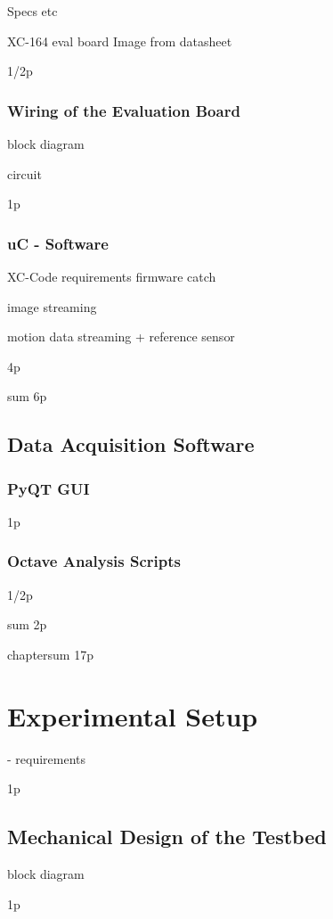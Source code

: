 \documentclass[12pt,a4paper]{article}
\begin{document}
Specs etc

XC-164 eval board 
  Image from datasheet

1/2p

\subsubsection{Wiring of the Evaluation Board}

  block diagram

  circuit

1p

\subsubsection{uC - Software}

  XC-Code
    requirements
    firmware catch

    image streaming

    motion data streaming
      + reference sensor

4p

sum 6p


\subsection{Data Acquisition Software}

\subsubsection{PyQT GUI}
1p

\subsubsection{Octave Analysis Scripts}
1/2p


sum 2p

chaptersum 17p

\section{Experimental Setup}

- requirements

1p

\subsection{Mechanical Design of the Testbed}

block diagram

1p
\end{document}
